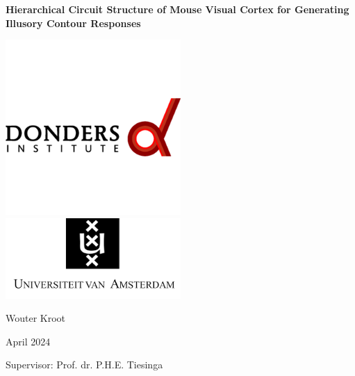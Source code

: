 \documentclass[12pt]{article}
\begin{document}
\captionsetup{font=small}

\begin{titlepage}
\centering

{\LARGE\bfseries Hierarchical Circuit Structure of Mouse Visual Cortex for Generating Illusory Contour Responses\par}

\vspace{5pt} %

\includegraphics[width=0.5\textwidth]{figures/donders_logo.png}
\includegraphics[width=0.5\textwidth]{figures/uva_logo.png}

\vspace{20pt} %

{\Large Wouter Kroot\par}
\vspace{5pt} %
{\Large April 2024\par}
\vspace{5pt}
{\Large Supervisor: Prof. dr. P.H.E. Tiesinga}

\end{titlepage}

\newpage
\end{document}
